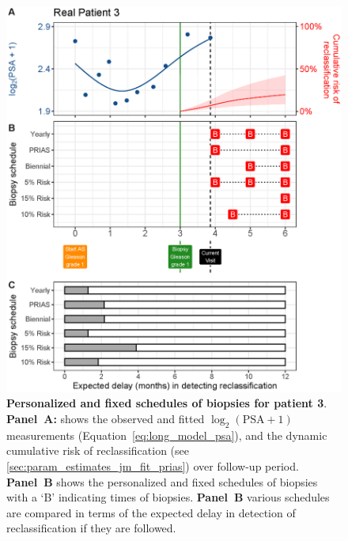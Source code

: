\begin{figure}
\centerline{\includegraphics[width=\columnwidth]{images/demo_pat3_supp.eps}}
\caption{\textbf{Personalized and fixed schedules of biopsies for patient 3}. \textbf{Panel~A:} shows the observed and fitted $\log_2(\mbox{PSA} + 1)$ measurements (Equation~\ref{eq:long_model_psa}), and the dynamic cumulative risk of reclassification (see \ref{sec:param_estimates_jm_fit_prias}) over follow-up period. \textbf{Panel~B} shows the personalized and fixed schedules of biopsies with a `B' indicating times of biopsies. \textbf{Panel~B} various schedules are compared in terms of the expected delay in detection of reclassification if they are followed.}
\label{fig:demo_pat3_supp}
\end{figure}